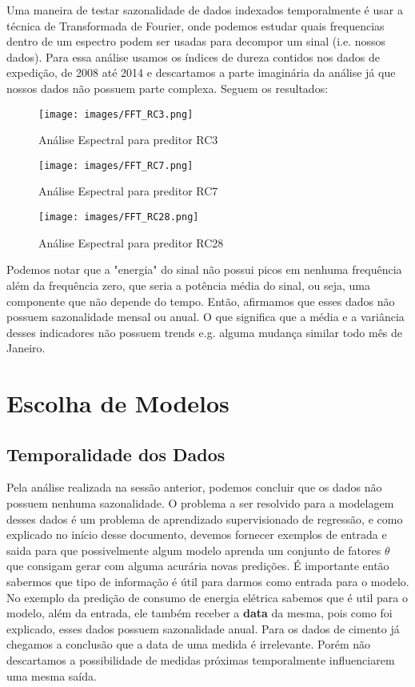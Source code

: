 \documentclass[a4paper]{article}
\begin{document}
Uma maneira de testar sazonalidade de dados indexados temporalmente é usar a técnica de Transformada de Fourier, onde podemos estudar quais frequencias dentro de um espectro podem ser usadas para decompor um sinal (i.e. nossos dados). Para essa análise usamos os índices de dureza contidos nos dados de expedição, de 2008 até 2014 e descartamos a parte imaginária da análise já que nossos dados não possuem parte complexa. Seguem os resultados:


\begin{figure}[H]
\centering
\texttt{[image: images/FFT\_RC3.png]}
\caption{Análise Espectral para preditor RC3}
\end{figure}

\begin{figure}[H]
\centering
\texttt{[image: images/FFT\_RC7.png]}
\caption{Análise Espectral para preditor RC7}
\end{figure}

\begin{figure}[H]
\centering
\texttt{[image: images/FFT\_RC28.png]}
\caption{Análise Espectral para preditor RC28}
\end{figure}


Podemos notar que a "energia" do sinal não possui picos em nenhuma frequência além da frequência zero, que seria a potência média do sinal, ou seja, uma componente que não depende do tempo. Então, afirmamos que esses dados não possuem sazonalidade mensal ou anual. O que significa que a média e a variância desses indicadores não possuem trends e.g. alguma mudança similar todo mês de Janeiro.


\section{Escolha de Modelos}

\subsection{Temporalidade dos Dados}

Pela análise realizada na sessão anterior, podemos concluir que os dados não possuem nenhuma sazonalidade. O problema a ser resolvido para a modelagem desses dados é um problema de aprendizado supervisionado de regressão, e como explicado no início desse documento, devemos fornecer exemplos de entrada e saida para que possivelmente algum modelo aprenda um conjunto de fatores $\theta$ que consigam gerar com alguma acurária novas predições. É importante então sabermos que tipo de informação é útil para darmos como entrada para o modelo. No exemplo da predição de consumo de energia elétrica sabemos que é util para o modelo, além da entrada, ele também receber a \textbf{data} da mesma, pois como foi explicado, esses dados possuem sazonalidade anual. Para os dados de cimento já chegamos a conclusão que a data de uma medida é irrelevante. Porém não descartamos a possibilidade de medidas próximas temporalmente influenciarem uma mesma saída.
\end{document}
